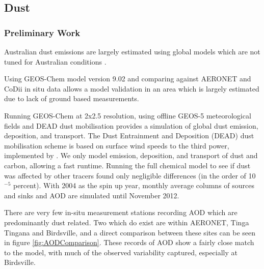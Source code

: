 \subsection{Dust}
\subsubsection{Preliminary Work}
Australian dust emissions are largely estimated using global models which are not tuned for Australian conditions \cite{Ridley_2013,Duncan_Fairlie_2007}.

Using GEOS-Chem model version 9.02 and comparing against AERONET and CoDii in situ data allows a model validation in an area which is largely estimated due to lack of ground based measurements.

Running GEOS-Chem at 2x2.5 resolution, using offline GEOS-5 meteorological fields and DEAD dust mobilisation provides a simulation of global dust emission, deposition, and transport.
The Dust Entrainment and Deposition (DEAD) dust mobilisation scheme is based on surface wind speeds to the third power, implemented by \citet{Duncan_Fairlie_2007}.
We only model emission, deposition, and transport of dust and carbon, allowing a fast runtime.
Running the full chemical model to see if dust was affected by other tracers found only negligible differences (in the order of 10$^{-5}$ percent).
With 2004 as the spin up year, monthly average columns of sources and sinks and AOD are simulated until November 2012.

There are very few in-situ measurement stations recording AOD which are predominantly dust related.
Two which do exist are within AERONET, Tinga Tingana and Birdsville, and a direct comparison between these sites can be seen in figure \ref{fig:AODComparison}.
These records of AOD show a fairly close match to the model, with much of the observed variability captured, especially at Birdsville.
